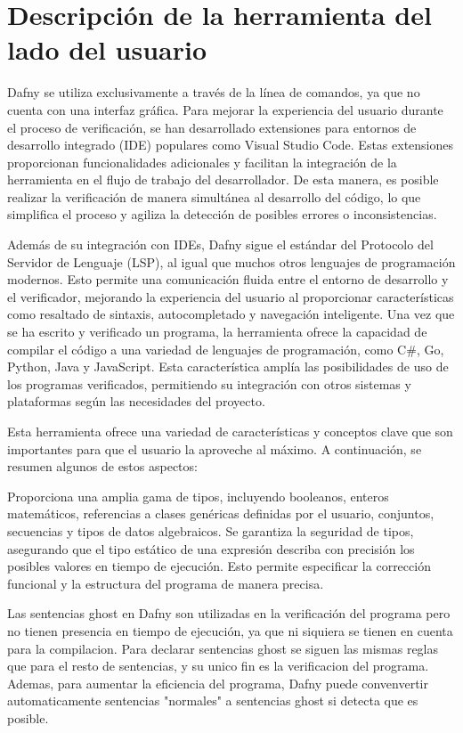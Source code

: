 \documentclass[runningheads]{llncs}
\begin{document}
\section{Descripción de la herramienta del lado del usuario}

Dafny se utiliza exclusivamente a través de la línea de comandos, ya que no cuenta con una interfaz gráfica.
Para mejorar la experiencia del usuario durante el proceso de verificación, se han desarrollado extensiones para entornos de desarrollo integrado (IDE) populares como Visual Studio Code.
Estas extensiones proporcionan funcionalidades adicionales y facilitan la integración de la herramienta en el flujo de trabajo del desarrollador.
De esta manera, es posible realizar la verificación de manera simultánea al desarrollo del código, lo que simplifica el proceso y agiliza la detección de posibles errores o inconsistencias.

Además de su integración con IDEs, Dafny sigue el estándar del Protocolo del Servidor de Lenguaje (LSP), al igual que muchos otros lenguajes de programación modernos.
Esto permite una comunicación fluida entre el entorno de desarrollo y el verificador, mejorando la experiencia del usuario al proporcionar características como resaltado de sintaxis, autocompletado y navegación inteligente.
Una vez que se ha escrito y verificado un programa, la herramienta ofrece la capacidad de compilar el código a una variedad de lenguajes de programación, como C\#, Go, Python, Java y JavaScript.
Esta característica amplía las posibilidades de uso de los programas verificados, permitiendo su integración con otros sistemas y plataformas según las necesidades del proyecto.

Esta herramienta ofrece una variedad de características y conceptos clave que son importantes para que el usuario la aproveche al máximo.
A continuación, se resumen algunos de estos aspectos:

Proporciona una amplia gama de tipos, incluyendo booleanos, enteros matemáticos, referencias a clases genéricas definidas por el usuario, conjuntos, secuencias y tipos de datos algebraicos.
Se garantiza la seguridad de tipos, asegurando que el tipo estático de una expresión describa con precisión los posibles valores en tiempo de ejecución.
Esto permite especificar la corrección funcional y la estructura del programa de manera precisa.

Las sentencias ghost en Dafny son utilizadas en la verificación del programa pero no tienen presencia en tiempo de ejecución, ya que ni siquiera se tienen en cuenta para la compilacion.
Para declarar sentencias ghost se siguen las mismas reglas que para el resto de sentencias, y su unico fin es la verificacion del programa.
Ademas, para aumentar la eficiencia del programa, Dafny puede convenvertir automaticamente sentencias "normales" a sentencias ghost si detecta que es posible.
\end{document}
